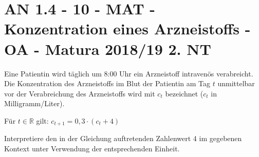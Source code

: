 \section{AN 1.4 - 10 - MAT - Konzentration eines Arzneistoffs - OA - Matura 2018/19 2. NT}

\begin{beispiel}[AN 1.4]{1}
Eine Patientin wird täglich um 8:00 Uhr ein Arzneistoff intravenös verabreicht. Die Konzentration des Arzneistoffs im Blut der Patientin am Tag $t$ unmittelbar vor der Verabreichung des Arzneistoffs wird mit $c_t$ bezeichnet ($c_t$ in Milligramm/Liter).

Für $t\in\mathbb{R}$ gilt: $c_{t+1}=0,3\cdot(c_t+4)$

Interpretiere den in der Gleichung auftretenden Zahlenwert 4 im gegebenen Kontext unter Verwendung der entsprechenden Einheit.

\end{beispiel}